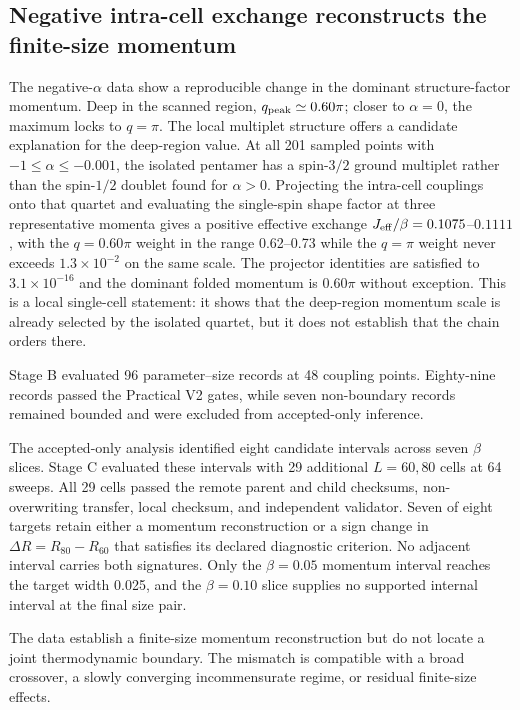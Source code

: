 \subsection{Negative intra-cell exchange reconstructs the finite-size momentum}

The negative-$\alpha$ data show a reproducible change in the dominant structure-factor momentum.
Deep in the scanned region, $q_{\mathrm{peak}}\simeq0.60\pi$; closer to $\alpha=0$, the maximum locks to $q=\pi$.
The local multiplet structure offers a candidate explanation for the deep-region value.
At all 201 sampled points with $-1\leq\alpha\leq-0.001$, the isolated pentamer has a spin-$3/2$ ground multiplet rather than the spin-$1/2$ doublet found for $\alpha>0$.
Projecting the intra-cell couplings onto that quartet and evaluating the single-spin shape factor at three representative momenta gives a positive effective exchange $J_{\mathrm{eff}}/\beta=0.1075$--$0.1111$, with the $q=0.60\pi$ weight in the range 0.62--0.73 while the $q=\pi$ weight never exceeds $1.3\times10^{-2}$ on the same scale.
The projector identities are satisfied to $3.1\times10^{-16}$ and the dominant folded momentum is $0.60\pi$ without exception.
This is a local single-cell statement: it shows that the deep-region momentum scale is already selected by the isolated quartet, but it does not establish that the chain orders there.

Stage B evaluated 96 parameter--size records at 48 coupling points.
Eighty-nine records passed the Practical V2 gates, while seven non-boundary records remained bounded and were excluded from accepted-only inference.

The accepted-only analysis identified eight candidate intervals across seven $\beta$ slices.
Stage C evaluated these intervals with 29 additional $L=60,80$ cells at 64 sweeps.
All 29 cells passed the remote parent and child checksums, non-overwriting transfer, local checksum, and independent validator.
Seven of eight targets retain either a momentum reconstruction or a sign change in $\Delta R=R_{80}-R_{60}$ that satisfies its declared diagnostic criterion.
No adjacent interval carries both signatures.
Only the $\beta=0.05$ momentum interval reaches the target width 0.025, and the $\beta=0.10$ slice supplies no supported internal interval at the final size pair.

The data establish a finite-size momentum reconstruction but do not locate a joint thermodynamic boundary.
The mismatch is compatible with a broad crossover, a slowly converging incommensurate regime, or residual finite-size effects.

